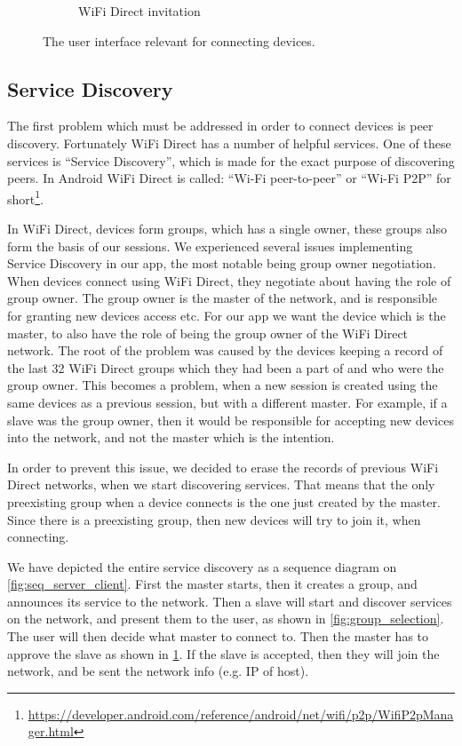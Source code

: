 \begin{figure}[ht]
\begin{subfigure}[b]{0.33\linewidth}
    \caption{WiFi Direct invitation}
    \label{fig:wifidirectinv}
    \vspace{4ex}
  \end{subfigure}
  \caption{The user interface relevant for connecting devices.}
  \label{fig:connecting}
\end{figure}

\subsection{Service Discovery}

The first problem which must be addressed in order to connect devices is peer discovery.
Fortunately WiFi Direct has a number of helpful services.
One of these services is ``Service Discovery'', which is made for the exact purpose of discovering peers.
In Android WiFi Direct is called: ``Wi-Fi peer-to-peer'' or ``Wi-Fi P2P'' for short\footnote{\url{https://developer.android.com/reference/android/net/wifi/p2p/WifiP2pManager.html}}.

In WiFi Direct, devices form groups, which has a single owner, these groups also form the basis of our sessions.
We experienced several issues implementing Service Discovery in our app, the most notable being group owner negotiation.
When devices connect using WiFi Direct, they negotiate about having the role of group owner.
The group owner is the master of the network, and is responsible for granting new devices access etc.
For our app we want the device which is the master, to also have the role of being the group owner of the WiFi Direct network.
The root of the problem was caused by the devices keeping a record of the last 32 WiFi Direct groups which they had been a part of and who were the group owner.
This becomes a problem, when a new session is created using the same devices as a previous session, but with a different master.
For example, if a slave was the group owner, then it would be responsible for accepting new devices into the network, and not the master which is the intention.

In order to prevent this issue, we decided to erase the records of previous WiFi Direct networks, when we start discovering services.
That means that the only preexisting group when a device connects is the one just created by the master.
Since there is a preexisting group, then new devices will try to join it, when connecting.

We have depicted the entire service discovery as a sequence diagram on \cref{fig:seq_server_client}.
First the master starts, then it creates a group, and announces its service to the network.
Then a slave will start and discover services on the network, and present them to the user, as shown in \cref{fig:group_selection}.
The user will then decide what master to connect to.
Then the master has to approve the slave as shown in \cref{fig:wifidirectinv}.
If the slave is accepted, then they will join the network, and be sent the network info (e.g. IP of host).

